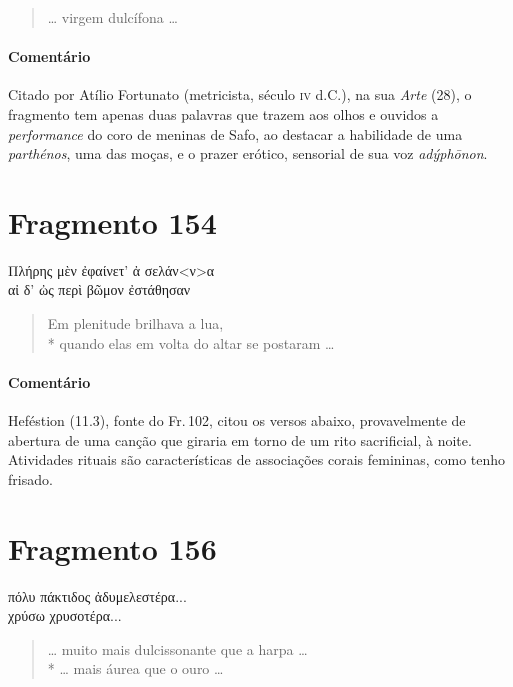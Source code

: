 \begin{verse}
\ldots{} virgem dulcífona \ldots{}
\end{verse}

\medskip

{\paragraph{Comentário} Citado por Atílio Fortunato (metricista, século \textsc{iv} d.C.), na sua \textit{Arte} (28), o fragmento tem apenas duas palavras que trazem aos olhos e ouvidos a \textit{performance} do coro de meninas de Safo, ao destacar a habilidade de uma \textit{parthénos}, uma das moças, e o prazer erótico, sensorial de sua voz \textit{adýphōnon}.}


\pagebreak
\section{Fragmento 154}

\begin{gkverse}
Πλήρης μὲν ἐφαίνετ’ ἀ σελάν<ν>α\\
αἰ δ’ ὠς περὶ βῶμον ἐστάθησαν
\end{gkverse}

\begin{verse}
Em plenitude brilhava a lua, \\*
quando elas em volta do altar se postaram \ldots{}
\end{verse}

\medskip

{\paragraph{Comentário} Heféstion (11.3), fonte do Fr.\,102, citou os versos abaixo, provavelmente de abertura
de uma canção que giraria em torno de um rito sacrificial, à noite. Atividades rituais são características de associações corais femininas, como tenho frisado.}


\section{Fragmento 156}

\begin{gkverse}
πόλυ πάκτιδος ἀδυμελεστέρα...\\
χρύσω χρυσοτέρα...
\end{gkverse}

\begin{verse}
\ldots{} muito mais dulcissonante que a harpa \ldots{}\\*
\ldots{} mais áurea que o ouro \ldots{}
\end{verse}

